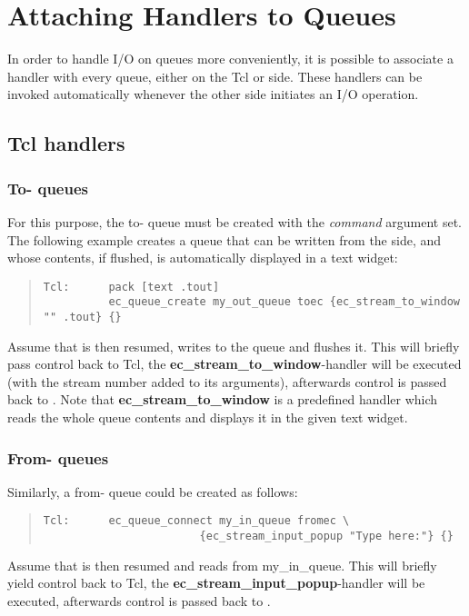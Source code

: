 \section{Attaching Handlers to Queues}
\label{embtclhandlers}

In order to handle {\eclipse} I/O on queues more conveniently,
it is possible to associate a handler with every queue, either on the Tcl
or {\eclipse} side.
These handlers can be invoked automatically whenever the other side initiates
an I/O operation.

\subsection{Tcl handlers}

\subsubsection{To-{\eclipse} queues}

For this purpose, the to-{\eclipse} queue must be created with the {\it
command\/} argument set. The following example creates a queue that
can be written from the {\eclipse} side, and whose contents, if flushed,
is automatically displayed in a text widget:
\begin{quote}\begin{verbatim}
Tcl:      pack [text .tout]
          ec_queue_create my_out_queue toec {ec_stream_to_window "" .tout} {}
\end{verbatim}\end{quote}
Assume that {\eclipse} is then resumed, writes to the queue and
flushes it.  This will briefly pass control back to Tcl, the {\bf
ec_stream_to_window}-handler will be executed (with the stream number
added to its arguments), afterwards control is passed back to
{\eclipse}.  Note that {\bf ec_stream_to_window} is a predefined
handler which reads the whole queue contents and displays it in the
given text widget.

\subsubsection{From-{\eclipse} queues}
Similarly, a from-{\eclipse} queue could be created as follows:
\begin{quote}\begin{verbatim}
Tcl:      ec_queue_connect my_in_queue fromec \
                        {ec_stream_input_popup "Type here:"} {}
\end{verbatim}\end{quote}
Assume that {\eclipse} is then resumed and reads from my_in_queue.
This will briefly yield control back to Tcl, the
{\bf ec_stream_input_popup}-handler will be executed,
afterwards control is passed back to {\eclipse}.


